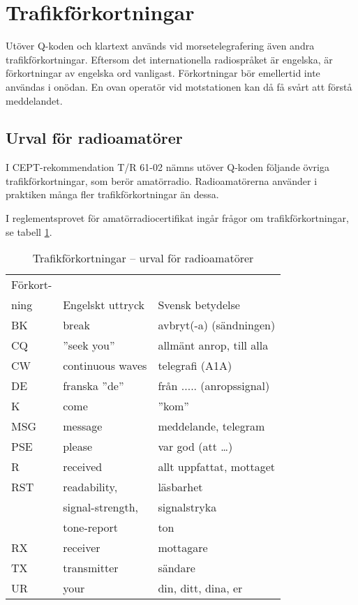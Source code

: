 \section{Trafikförkortningar}

Utöver Q-koden och klartext används vid morsetelegrafering även andra
trafikförkortningar.
Eftersom det internationella radiospråket är engelska, är förkortningar av
engelska ord vanligast.
Förkortningar bör emellertid inte användas i onödan.
En ovan operatör vid motstationen kan då få svårt att förstå meddelandet.

\subsection{Urval för radioamatörer}

I CEPT-rekommendation T/R 61-02 nämns utöver Q-koden följande övriga
trafikförkortningar, som berör amatörradio.
Radioamatörerna använder i praktiken många fler trafikförkortningar än dessa.

I reglementsprovet för amatörradiocertifikat ingår frågor om
trafikförkortningar, se tabell \ref{tab:trafikforkortningar}.

\begin{table}
  \caption{Trafikförkortningar -- urval för radioamatörer}
  \label{tab:trafikforkortningar}
  \begin{tabular}{lll}
    Förkort- & & \\
    ning & Engelskt uttryck & Svensk betydelse \\
    \hline
    BK & break & avbryt(-a) (sändningen) \\
    CQ & ''seek you'' & allmänt anrop, till alla \\
    CW & continuous waves & telegrafi (A1A) \\
    DE & franska ''de'' & från ..... (anropssignal) \\
    K  & come & ''kom'' \\
    MSG & message & meddelande, telegram \\
    PSE & please & var god (att \dots) \\
    R & received & allt uppfattat, mottaget \\
   RST & readability, & läsbarhet \\
   & signal-strength, & signalstryka \\
   & tone-report & ton \\
    RX & receiver & mottagare \\
    TX & transmitter & sändare \\
    UR & your & din, ditt, dina, er \\
  \end{tabular}
\end{table}

